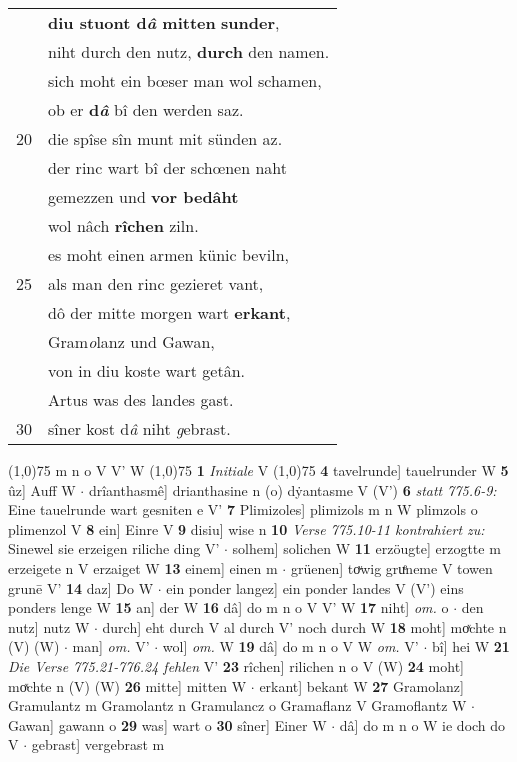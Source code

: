 \documentclass[8pt,a4paper,notitlepage]{article}
\begin{document}
\begin{table}[ht]
\begin{minipage}[t]{0.5\linewidth}
\begin{tabular}{rl}
 & \textbf{diu stuont d\textit{â} mitten} \textbf{sunder},\\ 
 & niht durch den nutz, \textbf{durch} den namen.\\ 
 & sich moht ein bœser man wol schamen,\\ 
 & ob er \textbf{d\textit{â}} bî den werden saz.\\ 
20 & die spîse sîn munt mit sünden az.\\ 
 & der rinc wart bî der schœnen naht\\ 
 & gemezzen und \textbf{vor bedâht}\\ 
 & wol nâch \textbf{rîchen} ziln.\\ 
 & es moht einen armen künic beviln,\\ 
25 & als man den rinc gezieret vant,\\ 
 & dô der mitte morgen wart \textbf{erkant},\\ 
 & Gram\textit{o}lanz und Gawan,\\ 
 & von in diu koste wart getân.\\ 
 & Artus was des landes gast.\\ 
30 & sîner kost d\textit{â} niht \textit{g}ebrast.\\ 
\end{tabular}
\scriptsize
\line(1,0){75} \newline
m n o V V' W \newline
\line(1,0){75} \newline
\textbf{1} \textit{Initiale} V  \newline
\line(1,0){75} \newline
\textbf{4} tavelrunde] tauelrunder W \textbf{5} ûz] Auff W  $\cdot$ drîanthasmê] drianthasine n (o) dẏantasme V (V') \textbf{6} \textit{statt 775.6-9:} Eine tauelrunde wart gesniten e V'  \textbf{7} Plimizoles] plimizols m n W plimzols o plimenzol V \textbf{8} ein] Einre V \textbf{9} disiu] wise n \textbf{10} \textit{Verse 775.10-11 kontrahiert zu:} Sinewel sie erzeigen riliche ding V'   $\cdot$ solhem] solichen W \textbf{11} erzöugte] erzogtte m erzeigete n V erzaiget W \textbf{13} einem] einen m  $\cdot$ grüenen] toͮwig gruͤneme V towen grunē V' \textbf{14} daz] Do W  $\cdot$ ein ponder langez] ein ponder landes V (V') eins ponders lenge W \textbf{15} an] der W \textbf{16} dâ] do m n o V V' W \textbf{17} niht] \textit{om.} o  $\cdot$ den nutz] nutz W  $\cdot$ durch] eht durch V al durch V' noch durch W \textbf{18} moht] moͯchte n (V) (W)  $\cdot$ man] \textit{om.} V'  $\cdot$ wol] \textit{om.} W \textbf{19} dâ] do m n o V W \textit{om.} V'  $\cdot$ bî] hei W \textbf{21} \textit{Die Verse 775.21-776.24 fehlen} V'  \textbf{23} rîchen] rilichen n o V (W) \textbf{24} moht] moͯchte n (V) (W) \textbf{26} mitte] mitten W  $\cdot$ erkant] bekant W \textbf{27} Gramolanz] Gramulantz m Gramolantz n Gramulancz o Gramaflanz V Gramoflantz W  $\cdot$ Gawan] gawann o \textbf{29} was] wart o \textbf{30} sîner] Einer W  $\cdot$ dâ] do m n o W ie doch do V  $\cdot$ gebrast] vergebrast m \newline
\end{minipage}
\end{table}
\end{document}

